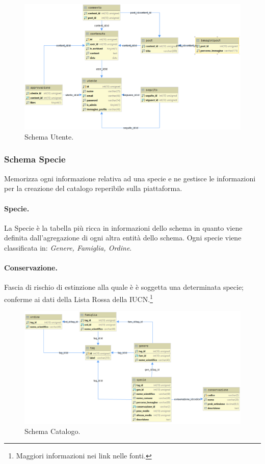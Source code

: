 \documentclass[12pt, a4paper]{article}
\begin{document}
    \begin{figure}[htbp]
        \caption{Schema Utente.}
        \label{fig:database1}
        \hspace*{-2cm}
        \includegraphics[scale= 0.5]{webBirdDB@localhostUser.png}
    \end{figure}


    \subsubsection{Schema Specie}
    Memorizza ogni informazione relativa ad una specie e ne gestisce le informazioni per la creazione del
    catalogo reperibile sulla piattaforma.
    \paragraph{Specie.} La Specie è la tabella  più ricca in informazioni dello schema in quanto viene definita
    dall'agregazione di ogni altra entità dello schema.
    Ogni specie viene classificata in: \emph{Genere, Famiglia, Ordine}.
    \paragraph{Conservazione.} Fascia di rischio di estinzione alla quale è è soggetta una determinata
    specie; conferme ai dati della Lista Rossa della IUCN.\footnote{Maggiori informazioni nei link nelle fonti.}

    \begin{figure}[htbp]
        \caption{Schema Catalogo.}
        \label{fig:database2}
        \hspace*{-2cm}
        \includegraphics[scale= 0.5]{webBirdDB@localhostBirds.png}
    \end{figure}
\end{document}
